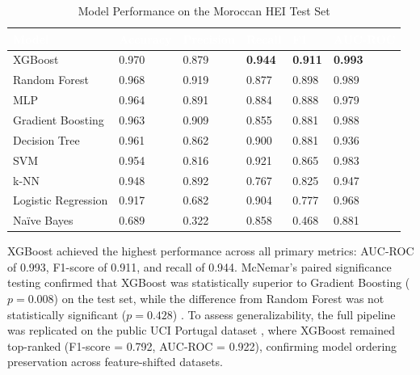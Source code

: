 \documentclass[12pt]{report}
\begin{document}
\begin{table}[H]
    \centering
    \caption{Model Performance on the Moroccan HEI Test Set \parencite{bettahi2025}}
    \label{tab:bettahi_results}
    {
    \begin{tabular}{|p{3.5cm}|p{1.6cm}|p{1.5cm}|p{1.4cm}|p{1.0cm}|p{2.0cm}|}
    \hline
    \rowcolor{tableblue}
    \textcolor{white}{\textbf{Model}} &
    \textcolor{white}{\textbf{Accuracy}} &
    \textcolor{white}{\textbf{Precision}} &
    \textcolor{white}{\textbf{Recall}} &
    \textcolor{white}{\textbf{F1}} &
    \textcolor{white}{\textbf{AUC-ROC}} \\ \hline
    XGBoost             & 0.970 & 0.879 & \textbf{0.944} & \textbf{0.911} & \textbf{0.993} \\ \hline
    Random Forest       & 0.968 & 0.919 & 0.877 & 0.898 & 0.989 \\ \hline
    MLP                 & 0.964 & 0.891 & 0.884 & 0.888 & 0.979 \\ \hline
    Gradient Boosting   & 0.963 & 0.909 & 0.855 & 0.881 & 0.988 \\ \hline
    Decision Tree       & 0.961 & 0.862 & 0.900 & 0.881 & 0.936 \\ \hline
    SVM                 & 0.954 & 0.816 & 0.921 & 0.865 & 0.983 \\ \hline
    k-NN                & 0.948 & 0.892 & 0.767 & 0.825 & 0.947 \\ \hline
    Logistic Regression & 0.917 & 0.682 & 0.904 & 0.777 & 0.968 \\ \hline
    Na\"{i}ve Bayes     & 0.689 & 0.322 & 0.858 & 0.468 & 0.881 \\ \hline
    \end{tabular}}
\end{table}

XGBoost achieved the highest performance across all primary metrics:
AUC-ROC of 0.993, F1-score of 0.911, and recall of 0.944. McNemar's
paired significance testing confirmed that XGBoost was statistically
superior to Gradient Boosting ($p = 0.008$) on the test set, while the
difference from Random Forest was not statistically significant
($p = 0.428$) \parencite{bettahi2025}. To assess generalizability, the
full pipeline was replicated on the public UCI Portugal dataset
\parencite{Realinho2021}, where XGBoost remained top-ranked (F1-score
= 0.792, AUC-ROC = 0.922), confirming model ordering preservation across
feature-shifted datasets.
\end{document}
